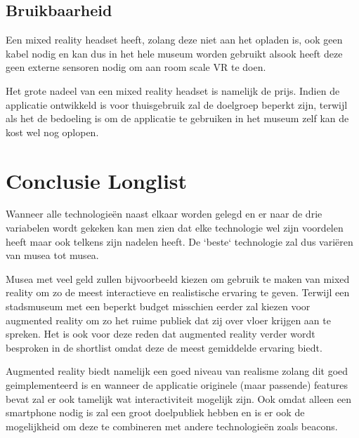 \subsection{Bruikbaarheid}
Een mixed reality headset heeft, zolang deze niet aan het opladen is, ook geen kabel nodig en kan dus in het hele museum worden gebruikt alsook heeft deze geen externe sensoren nodig om aan room scale VR te doen. 

Het grote nadeel van een mixed reality headset is namelijk de prijs. Indien de applicatie ontwikkeld is voor thuisgebruik zal de doelgroep beperkt zijn, terwijl als het de bedoeling is om de applicatie te gebruiken in het museum zelf kan de kost wel nog oplopen.


\section{Conclusie Longlist}
Wanneer alle technologieën naast elkaar worden gelegd en er naar de drie variabelen wordt gekeken kan men zien dat elke technologie wel zijn voordelen heeft maar ook telkens zijn nadelen heeft. De `beste` technologie zal dus variëren van musea tot musea. 

Musea met veel geld zullen bijvoorbeeld kiezen om gebruik te maken van mixed reality om zo de meest interactieve en realistische ervaring te geven. Terwijl een stadsmuseum met een beperkt budget misschien eerder zal kiezen voor augmented reality om zo het ruime publiek dat zij over vloer krijgen aan te spreken. Het is ook voor deze reden dat augmented reality verder wordt besproken in de shortlist omdat deze de meest gemiddelde ervaring biedt.

Augmented reality biedt namelijk een goed niveau van realisme zolang dit goed geimplementeerd is en wanneer de applicatie originele (maar passende) features bevat zal er ook tamelijk wat interactiviteit mogelijk zijn. Ook omdat alleen een smartphone nodig is zal een groot doelpubliek hebben en is er ook de mogelijkheid om deze te combineren met andere technologieën zoals beacons.